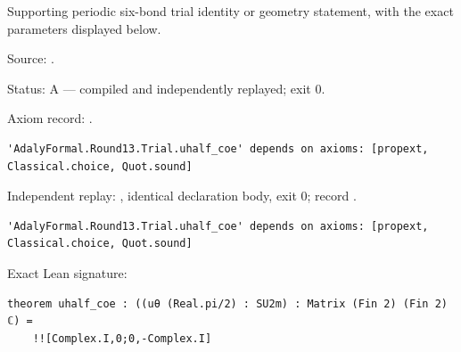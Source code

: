 \begin{theorem}[bp-410]
\label{bp-410}
\uses{}
\leanok
Supporting periodic six-bond trial identity or geometry statement, with the exact parameters displayed below.

\par Source: \texttt{}.
\par Status: A — compiled and independently replayed; exit 0.
\par Axiom record: \texttt{}.
\begin{verbatim}
'AdalyFormal.Round13.Trial.uhalf_coe' depends on axioms: [propext, Classical.choice, Quot.sound]
\end{verbatim}
\par Independent replay: \texttt{}, identical declaration body, exit 0; record \texttt{}.
\begin{verbatim}
'AdalyFormal.Round13.Trial.uhalf_coe' depends on axioms: [propext, Classical.choice, Quot.sound]
\end{verbatim}
\par Exact Lean signature:
\begin{verbatim}
theorem uhalf_coe : ((uθ (Real.pi/2) : SU2m) : Matrix (Fin 2) (Fin 2) ℂ) =
    !![Complex.I,0;0,-Complex.I]
\end{verbatim}
\end{theorem}

